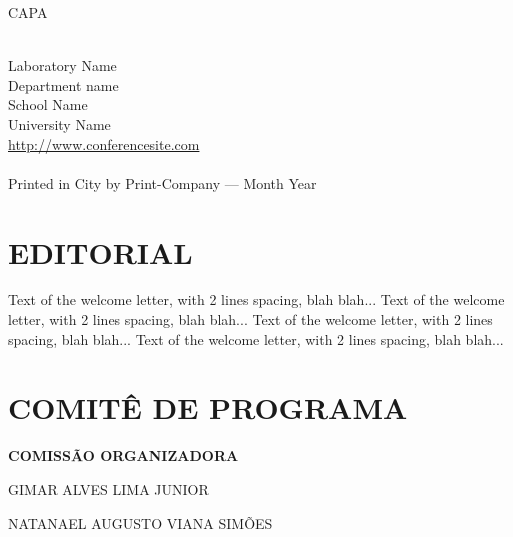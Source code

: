 \documentclass[a4paper,12pt,twoside,onesidepapers,%
  electronic,%
  papers=final,%
  headers=allpages,%
	onecoltoc,
	tocnum=right,
	twocolindex,
	movepagenumber=true,%
hyperref={bookmarksdepth=1,bookmarksopen,bookmarksopenlevel=0,%
 linkcolor=black,urlcolor=blue}, %
  geometry={text={175truemm,226truemm},%
    inner=0.69in,top=25mm,bottom=28mm,footskip=10.4mm,voffset=0mm},%
]{confproc}
\author{\procpdfauthor}
\title{\procpdftitle}
\begin{document}
\frontmatter
\setcounter{page}{1}
CAPA
\newpage

\vspace *{1.7cm}
\thispagestyle{empty}
\\ Laboratory Name\\ Department name\\
School Name\\ University Name\\
\url{http://www.conferencesite.com}\\
\vspace*{0.15cm}\newline
{}\\
\vspace*{0.35cm}\newline
\noindent Printed in City by Print-Company --- Month Year
\newpage

\vspace*{0.6cm}
\section*{\centering \normalfont \LARGE EDITORIAL}
\vspace*{0.6cm}
\doublespace

 \begin{center}
	 \begin{minipage}[h]{14cm}
	 Text of the welcome letter, with 2 lines spacing, blah blah...
	 Text of the welcome letter, with 2 lines spacing, blah blah...
	 Text of the welcome letter, with 2 lines spacing, blah blah...
	 Text of the welcome letter, with 2 lines spacing, blah blah...
	 \end{minipage}
	\end{center}
\singlespace
\newpage

\vspace*{0.6cm}
\section*{\centering \normalfont \LARGE COMITÊ DE PROGRAMA}
\vspace*{0.6cm}
\doublespace

\noindent \textbf{COMISSÃO ORGANIZADORA}

GIMAR ALVES LIMA JUNIOR

NATANAEL AUGUSTO VIANA SIMÕES
\end{document}
